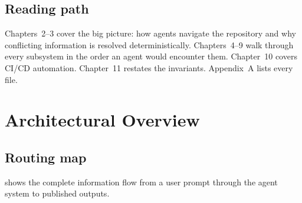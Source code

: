 \documentclass[a4paper,11pt,openany]{report}
\begin{document}
\section{Reading path}

Chapters~2--3 cover the big picture: how agents navigate the repository and
why conflicting information is resolved deterministically. Chapters~4--9 walk
through every subsystem in the order an agent would encounter them. Chapter~10
covers CI/CD automation. Chapter~11 restates the invariants. Appendix~A lists
every file.



\chapter{Architectural Overview}
\label{ch:architecture}


\section{Routing map}

 shows the complete information flow from a user prompt
through the agent system to published outputs.
\end{document}
